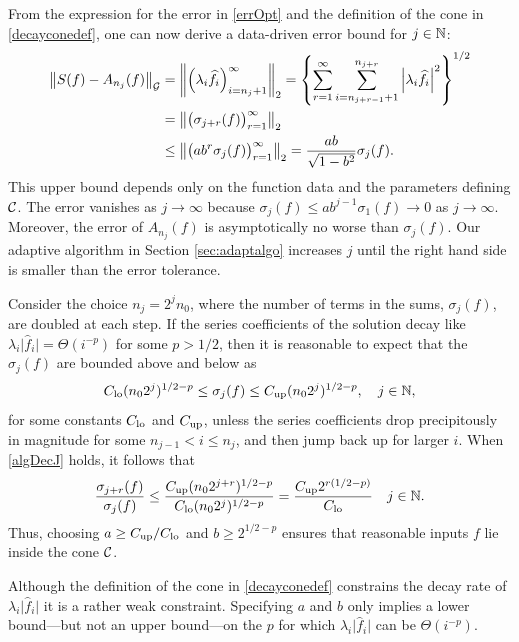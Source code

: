 \documentclass[graybox,footinfo]{svmult}
\newcommand{\DHJRnorm}[2][{}]{\ensuremath{\left \lVert #2 \right \rVert}_{#1}}
\newcommand{\DHJRabs}[1]{\ensuremath{{\left \lvert #1 \right \rvert}}}
\newcommand{\DHJRbigabs}[1]{\ensuremath{{\bigl \lvert #1 \bigr \rvert}}}
\begin{document}
From the expression for the error in \eqref{errOpt} and the definition of the cone in  \eqref{decayconedef}, one can now derive a data-driven error bound for $j \in {\mathbb{N}}$:
\begin{align}
\nonumber
\DHJRnorm[\calG]{S(f)-A_{n_j}(f)} &= \DHJRnorm[2]{\left(\lambda_{i} \widehat{f}_{i} \right)_{i = n_j+1}^\infty} = \left\{\sum_{r=1}^\infty \sum_{i=n_{j+r-1}+1}^{n_{j+r}}  \DHJRabs{\lambda_{i}\widehat{f}_{i} }^{2}  \right\}^{1/2}\\
\nonumber
&= \DHJRnorm[2]{ \bigl(\sigma_{j+r}(f)\bigr)_{r=1}^{\infty}} \\
&\le \DHJRnorm[2]{ \bigl(ab^r\sigma_{j}(f)\bigr)_{r=1}^{\infty}}
 = \displaystyle  \frac{ab}{\sqrt{1 - b^2}}\sigma_{j}(f).
 \label{algoineq}
\end{align}
This upper bound depends only on the function data and the parameters defining ${\mathcal{C}}$.  The error vanishes as $j \to \infty$ because $\sigma_j(f) \le ab^{j-1} \sigma_1(f) \to 0$ as $j \to \infty$.  Moreover, the error of $A_{n_j}(f)$ is asymptotically no worse than $\sigma_j(f)$. Our adaptive algorithm in Section \ref{sec:adaptalgo} increases $j$ until the right hand side is smaller than the error tolerance.

Consider the choice 
$n_j = 2^{j}n_0$,
where the number of terms in the sums, $\sigma_j(f)$, are doubled at each step.  If the series coefficients of the solution decay like $\lambda_{i} \DHJRbigabs{\widehat{f}_{i}} = \Theta(i^{-p})$ for some $p>1/2$, then it is reasonable to expect that the $\sigma_j(f)$ are bounded above and below as
\begin{equation} \label{algDecJ}
C_{\textup{lo}} (n_02^j)^{1/2-p} \le \sigma_j(f) \le C_{\textup{up}} (n_02^j)^{1/2-p}, \quad   j \in \bbN,
\end{equation}
for some constants $C_{\textup{lo}}$ and $C_{\textup{up}}$, unless the series coefficients drop precipitously in magnitude for some $n_{j-1} < i \le n_j$, and then jump back up for larger $i$.  When \eqref{algDecJ} holds, it follows that
\begin{equation*} 
\frac{\sigma_{j+r}(f)}{\sigma_j(f)} \le \frac{C_{\textup{up}} (n_02^{j+r})^{1/2-p}}{C_{\textup{lo}} (n_02^j)^{1/2-p}} = \frac{C_{\textup{up}} 2^{r(1/2-p)}}{C_{\textup{lo}}}\quad   j \in {\mathbb{N}}.
\end{equation*}
Thus, choosing $a \ge C_{\textup{up}}/C_{\textup{lo}}$ and $b \ge 2^{1/2-p}$ ensures that reasonable inputs $f$ lie inside the cone ${\mathcal{C}}$.

Although the definition of the cone in \eqref{decayconedef} constrains the decay rate of $\lambda_{i} \DHJRbigabs{\widehat{f}_{i}}$ it is a rather weak constraint.  Specifying $a$ and $b$ only implies a lower bound---but not an upper bound---on the $p$ for which $\lambda_{i} \DHJRbigabs{\widehat{f}_{i}}$ can be $\Theta(i^{-p})$.
\end{document}
